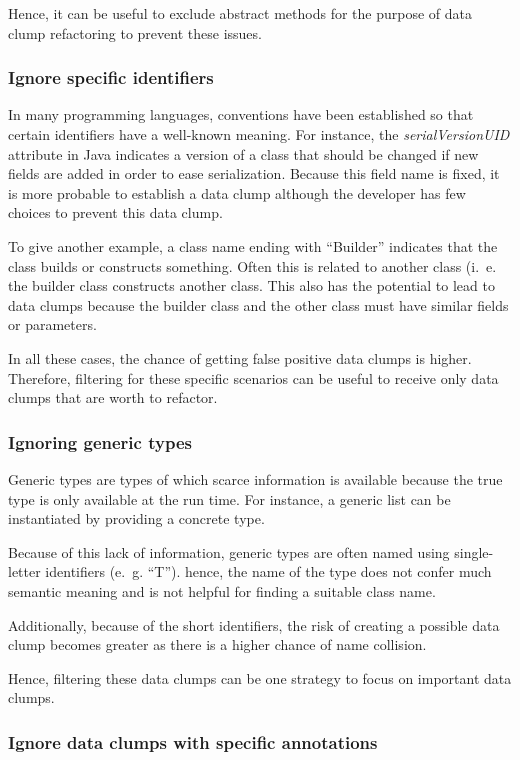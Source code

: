 Hence, it can be useful to exclude abstract methods for the purpose of data clump refactoring to prevent these issues. 

\subsubsection{Ignore specific identifiers}

In many programming languages, conventions have been established so that certain identifiers have a well-known meaning. For instance, the \textit{serialVersionUID} attribute in Java indicates a version of a class that should be changed if new fields are added in order to ease serialization. Because this field name is fixed, it is more probable to establish a data clump although the developer has few choices to prevent this data clump.

To give another example, a class name ending with \enquote{Builder} indicates that the class builds or constructs something. Often this is related to another class (i.~e. the builder class constructs another class. This also has the potential to lead to data clumps because the builder class and the other class must have similar fields or parameters. 

In all these cases, the chance of getting false positive data clumps is higher. Therefore, filtering for these specific scenarios can be useful to receive only data clumps that are worth to refactor. 

\subsubsection{Ignoring generic types}
Generic types are types of which scarce information is available because the true type is only available at the run time. For instance, a generic list can be instantiated by providing a concrete type.

Because of this lack of information, generic types are often named using  single-letter identifiers (e.~g. \enquote{T}). hence, the name of the type does not confer much semantic meaning and is not helpful for finding a suitable class name. 

Additionally, because of the short identifiers, the risk of creating a possible data clump becomes greater as there is a higher chance of name collision.

Hence, filtering these data clumps can be one strategy to focus on important data clumps. 

\subsubsection{Ignore data clumps with specific annotations}

